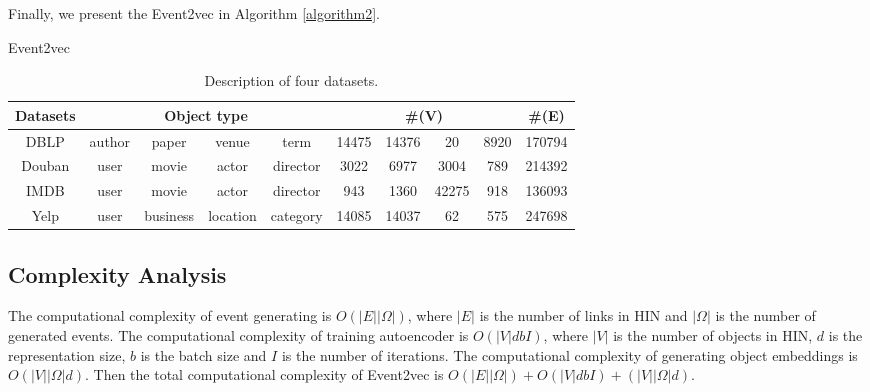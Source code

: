 Finally, we present the Event2vec in Algorithm \ref{algorithm2}.

\begin{algorithm}
	\DontPrintSemicolon
	\caption{Event2vec}\label{algorithm2}
\end{algorithm}

\begin{table*}
	\centering
	\caption{{\small Description of four datasets.}}\label{table1}
	\begin{tabular}{|c|c|c|c|c|c|c|c|c|c|}
		\toprule
		Datasets & \multicolumn{4}{|c|}{Object type} & \multicolumn{4}{|c|}{\#(V)} & \#(E) \\
		\midrule
		DBLP & author & paper & venue & term & 14475 & 14376 & 20 & 8920 & 170794 \\
		Douban & user & movie & actor & director & 3022 & 6977 & 3004 & 789 & 214392 \\
		IMDB & user & movie & actor & director & 943 & 1360 & 42275 & 918 & 136093\\
		Yelp & user & business & location & category & 14085 & 14037 & 62 & 575 & 247698 \\
		\bottomrule
	\end{tabular}
\end{table*}

\subsection{Complexity Analysis}\label{complexity}
The computational complexity of event generating is $O(|E||\Omega|)$, where $|E|$ is the number of links in HIN and $|\Omega|$ is the number of generated events. The computational complexity of training autoencoder is $O(|V|dbI)$, where $|V|$ is the number of objects in HIN, $d$ is the representation size, $b$ is the batch size and $I$ is the number of iterations. The computational complexity of generating object embeddings is $O(|V||\Omega|d)$. Then the total computational complexity of Event2vec is $O(|E||\Omega|)+O(|V|dbI)+(|V||\Omega|d)$.

